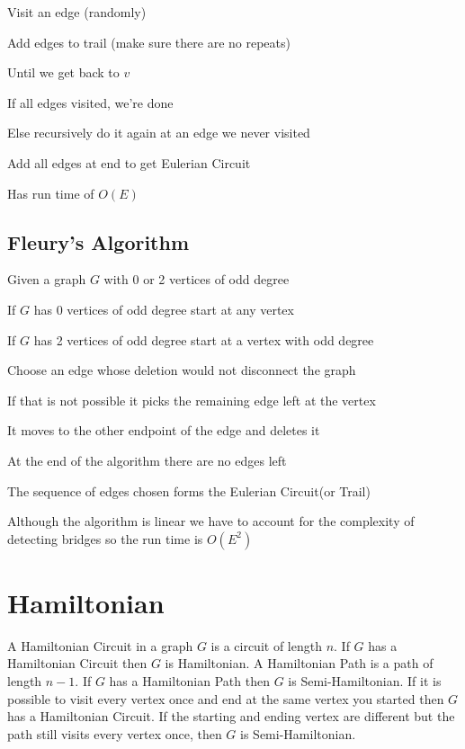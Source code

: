   Visit an edge (randomly)

  Add edges to trail (make sure there are no repeats)

  Until we get back to $v$

  If all edges visited, we're done

  Else recursively do it again at an edge we never visited

  Add all edges at end to get Eulerian Circuit

  Has run time of $O(E)$\cite{EulerianAlgos}
  \subsection{Fleury's Algorithm}
  Given a graph $G$ with 0 or  2 vertices of odd degree

  If $G$ has 0 vertices of odd degree start at any vertex

  If $G$ has 2 vertices of odd degree start at a vertex with odd degree

  Choose an edge whose deletion would not disconnect the graph

  If that is not possible it picks the remaining edge left at the vertex

  It moves to the other endpoint of the edge and deletes it

  At the end of the algorithm there are no edges left

  The sequence of edges chosen forms the Eulerian Circuit(or Trail)

  Although the algorithm is linear we have to account for the complexity of detecting bridges so the run time is $O(E^2)$\cite{EulerianAlgos}
 

  
  \section{Hamiltonian}
  A Hamiltonian Circuit in a graph $G$ is a circuit of length $n$. If $G$ has a Hamiltonian Circuit then $G$ is Hamiltonian. A Hamiltonian Path is a path of length $n-1$. If $G$ has a Hamiltonian Path then $G$ is Semi-Hamiltonian. If it is possible to visit every vertex once and end at the same vertex you started then $G$ has a Hamiltonian Circuit. If the starting and ending vertex are different but the path still visits every vertex once, then $G$ is Semi-Hamiltonian.

